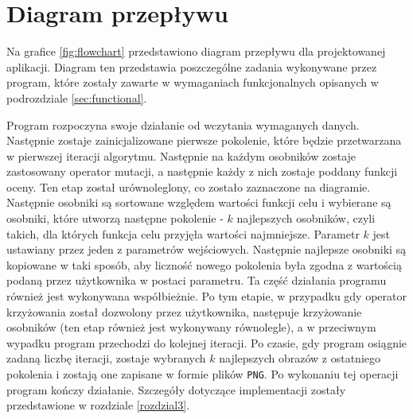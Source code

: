 \section{Diagram przepływu}
\label{sec:flowchart_desc}
Na grafice \ref{fig:flowchart} przedstawiono diagram przepływu dla projektowanej aplikacji. Diagram ten przedstawia poszczególne zadania wykonywane przez program, które zostały zawarte w wymaganiach funkcjonalnych opisanych w podrozdziale \ref{sec:functional}.

Program rozpoczyna swoje działanie od wczytania wymaganych danych. Następnie zostaje zainicjalizowane pierwsze pokolenie, które będzie przetwarzana w pierwszej iteracji algorytmu. Następnie na każdym osobników zostaje zastosowany operator mutacji, a następnie każdy z nich zostaje poddany funkcji oceny. Ten etap został urównoleglony, co zostało zaznaczone na diagramie. Następnie osobniki są sortowane względem wartości funkcji celu i wybierane są osobniki, które utworzą następne pokolenie - $k$ najlepszych osobników, czyli takich, dla których funkcja celu przyjęła wartości najmniejsze. Parametr $k$ jest ustawiany przez jeden z parametrów wejściowych. Następnie najlepsze osobniki są kopiowane w taki sposób, aby liczność nowego pokolenia była zgodna z wartością podaną przez użytkownika w postaci parametru. Ta część działania programu również jest wykonywana współbieżnie. Po tym etapie, w przypadku gdy operator krzyżowania został dozwolony przez użytkownika, następuje krzyżowanie osobników (ten etap również jest wykonywany równolegle), a w przeciwnym wypadku program przechodzi do kolejnej iteracji. Po czasie, gdy program osiągnie zadaną liczbę iteracji, zostaje wybranych $k$ najlepszych obrazów z ostatniego pokolenia i zostają one zapisane w formie plików \texttt{PNG}. Po wykonaniu tej operacji program kończy działanie. Szczegóły dotyczące implementacji zostały przedstawione w rozdziale \ref{rozdzial3}.

